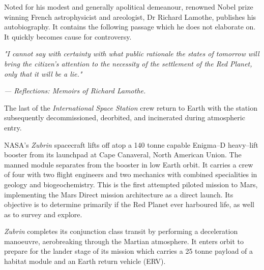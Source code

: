 

Noted for his modest and generally apolitical demeanour, renowned Nobel prize winning French astrophysicist and areologist, Dr Richard Lamothe, publishes his autobiography. It contains the following passage which he does not elaborate on. It quickly becomes cause for controversy.

\startTimelineGeneralDocument
{\it "I cannot say with certainty with what public rationale the states of tomorrow will bring the citizen's attention to the necessity of the settlement of the Red Planet, only that it will be a lie."}

\hskip 1.5cm {\it --- Reflections: Memoirs of Richard Lamothe.}
\stopTimelineGeneralDocument
\StopTimelineDate

The last of the {\it International Space Station} crew return to Earth with the station subsequently decommissioned, deorbited, and incinerated during atmospheric entry.
\StopTimelineDate

NASA's {\it Zubrin} spacecraft lifts off atop a 140 tonne capable Enigma--D heavy--lift booster from its launchpad at Cape Canaveral, North American Union. The manned module separates from the booster in low Earth orbit. It carries a crew of four with two flight engineers and two mechanics with combined specialities in geology and biogeochemistry. This is the first attempted piloted mission to Mars, implementing the Mars Direct mission architecture as a direct launch. Its objective is to determine primarily if the Red Planet ever harboured life, as well as to survey and explore.
\StopTimelineDate

{\it Zubrin} completes its conjunction class transit by performing a deceleration manoeuvre, aerobreaking through the Martian atmosphere. It enters orbit to prepare for the lander stage of its mission which carries a 25 tonne payload of a habitat module and an Earth return vehicle (ERV).
\StopTimelineDate

